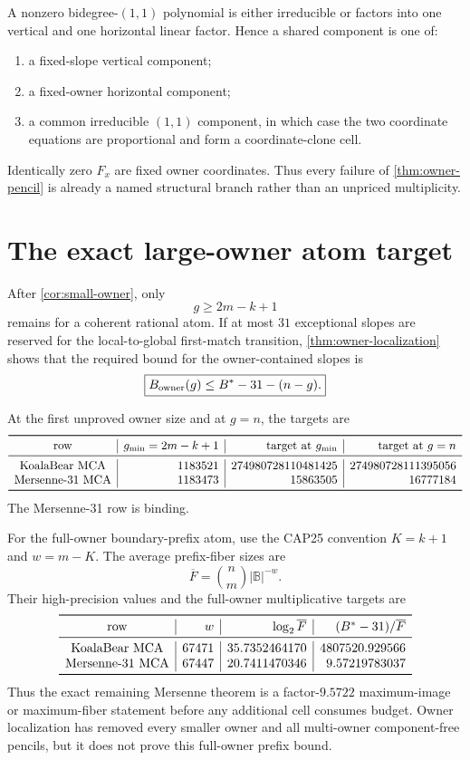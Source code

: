 \documentclass[11pt,a4paper]{amsart}
\numberwithin{equation}{section}
\theoremstyle{remark}
\begin{document}
\begin{remark}
A nonzero bidegree-$(1,1)$ polynomial is either irreducible or factors into one vertical and one horizontal linear factor.  Hence a shared component is one of:
\begin{enumerate}[label=\textup{(\roman*)}]
\item a fixed-slope vertical component;
\item a fixed-owner horizontal component;
\item a common irreducible $(1,1)$ component, in which case the two coordinate equations are proportional and form a coordinate-clone cell.
\end{enumerate}
Identically zero $F_x$ are fixed owner coordinates.  Thus every failure of \cref{thm:owner-pencil} is already a named structural branch rather than an unpriced multiplicity.
\end{remark}

\section{The exact large-owner atom target}

After \cref{cor:small-owner}, only
\[
 g\ge2m-k+1
\]
remains for a coherent rational atom.  If at most $31$ exceptional slopes are reserved for the local-to-global first-match transition, \cref{thm:owner-localization} shows that the required bound for the owner-contained slopes is
\begin{equation}\label{eq:owner-target}
 \boxed{
 B_{\rm owner}(g)
 \le B^*-31-(n-g).
 }
\end{equation}

At the first unproved owner size and at $g=n$, the targets are
\[
\begin{array}{c|r|r|r}
\toprule
\text{row}&g_{\min}=2m-k+1&\text{target at }g_{\min}&\text{target at }g=n\\
\midrule
\text{KoalaBear MCA}&1183521&274980728110481425&274980728111395056\\
\text{Mersenne-31 MCA}&1183473&15863505&16777184\\
\bottomrule
\end{array}
\]
The Mersenne-31 row is binding.

For the full-owner boundary-prefix atom, use the CAP25 convention $K=k+1$ and $w=m-K$.  The average prefix-fiber sizes are
\[
 \overline F=\binom nm|\mathbb B|^{-w}.
\]
Their high-precision values and the full-owner multiplicative targets are
\[
\begin{array}{c|r|r|r}
\toprule
\text{row}&w&\log_2\overline F&(B^*-31)/\overline F\\
\midrule
\text{KoalaBear MCA}&67471&35.7352464170&4807520.929566\\
\text{Mersenne-31 MCA}&67447&20.7411470346&9.57219783037\\
\bottomrule
\end{array}
\]
Thus the exact remaining Mersenne theorem is a factor-$9.5722$ maximum-image or maximum-fiber statement before any additional cell consumes budget.  Owner localization has removed every smaller owner and all multi-owner component-free pencils, but it does not prove this full-owner prefix bound.
\end{document}
